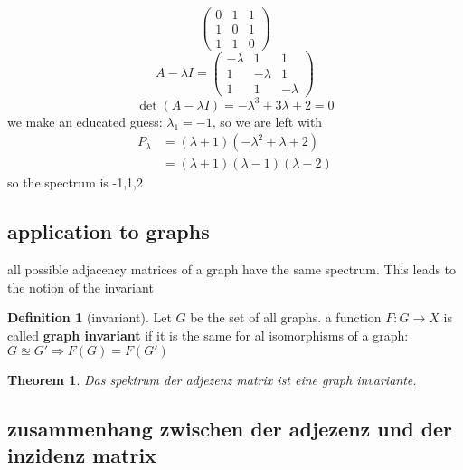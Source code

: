 \documentclass[a4paper]{article}
\newtheorem{theorem}{Theorem}[section]
\theoremstyle{definition}
\newtheorem*{definition}{Definition}
\theoremstyle{remark}
\begin{document}
\begin{equation}
  \begin{pmatrix}
  0&1&1\\1&0&1\\1&1&0
  \end{pmatrix}
\end{equation}
\begin{equation}
  A-\lambda I= \begin{pmatrix}
  -\lambda &1&1\\1&-\lambda &1\\1&1&-\lambda 
  \end{pmatrix}
\end{equation}
\begin{equation}
  \det(A-\lambda I)= -\lambda ^3+3\lambda +2=0
\end{equation}
we make an educated guess: $\lambda_1=-1$, so we are left with
\begin{equation*}
	\begin{split}
	P_\lambda &= (\lambda +1)(-\lambda ^2 +\lambda +2)\\
	&= (\lambda +1)(\lambda -1)(\lambda -2)
	\end{split}
\end{equation*}
so the spectrum is -1,1,2

\subsection{application to graphs}
\label{sub:application_to_graphs}
all possible adjacency matrices of a graph have the same spectrum. This leads to the notion of the invariant
\begin{definition}[invariant]
	Let $G$ be the set of all graphs. a function  $F: G\rightarrow X$ is called \textbf{graph invariant} if it is the same for al isomorphisms of a graph:\\
 	$G\approxeq G' \Rightarrow F(G)=F(G')$ 
\end{definition}

\begin{theorem}
Das spektrum der adjezenz matrix ist eine graph invariante.\\
\end{theorem}
\subsection{zusammenhang zwischen der adjezenz und der inzidenz matrix}
\label{sub:zusammenhang_zwischen_der_adjezenz_und_der_inzidenz_matrix}
\end{document}
